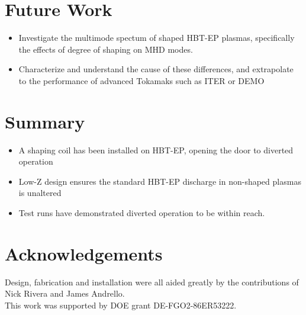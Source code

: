 \documentclass{article}
\begin{document}
\begin{multicols}{5}
\section{Future Work}
\begin{itemize}
\item Investigate the multimode spectum of shaped HBT-EP plasmas, specifically the effects of degree of shaping on MHD modes.
\item Characterize and understand the cause of these differences, and extrapolate to the performance of advanced Tokamaks such as ITER or DEMO
\end{itemize}
\section{Summary}
\label{sec:summary}
\begin{itemize}
\item A shaping coil has been installed on HBT-EP, opening the door to diverted operation
\item Low-Z design ensures the standard HBT-EP discharge in non-shaped plasmas is unaltered
\item Test runs have demonstrated diverted operation to be within reach.
\end{itemize}

\section{Acknowledgements}
Design, fabrication and installation were all aided greatly by the contributions of Nick Rivera and James Andrello.\\
This work was supported by DOE grant DE-FGO2-86ER53222.

\end{multicols}
\end{document}
